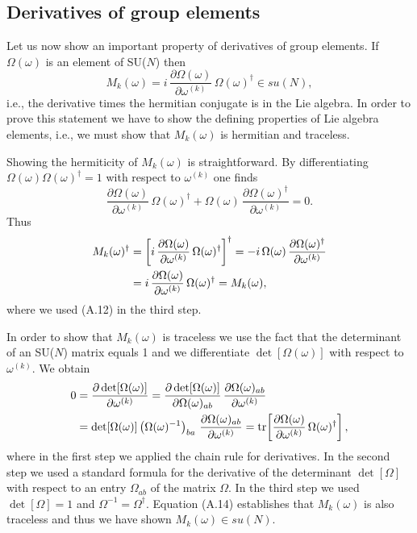 \subsection{Derivatives of group elements}

Let us now show an important property of derivatives of group elements. If
$\Omega(\omega)$ is an element of SU($N$) then
\begin{equation}
  M_k(\omega) = i\,\frac{\partial\Omega(\omega)}{\partial\omega^{(k)}}\,
  \Omega(\omega)^\dagger \in su(N),
\end{equation}
i.e., the derivative times the hermitian conjugate is in the Lie algebra. In
order to prove this statement we have to show the defining properties of Lie
algebra elements, i.e., we must show that $M_k(\omega)$ is hermitian and
traceless.

Showing the hermiticity of $M_k(\omega)$ is straightforward. By differentiating
$\Omega(\omega)\Omega(\omega)^\dagger = 1$ with respect to $\omega^{(k)}$ one
finds
\begin{equation}
  \frac{\partial\Omega(\omega)}{\partial\omega^{(k)}}\,\Omega(\omega)^\dagger
  + \Omega(\omega)\,\frac{\partial\Omega(\omega)^\dagger}{\partial\omega^{(k)}} = 0.
\end{equation}
Thus
\begin{align}
  M_k(\omega)^\dagger &=
  \left[ i\,\frac{\partial\Omega(\omega)}{\partial\omega^{(k)}}\,
  \Omega(\omega)^\dagger \right]^\dagger
  = -i\,\Omega(\omega)\,\frac{\partial\Omega(\omega)^\dagger}{\partial\omega^{(k)}} \notag\\
  &= i\,\frac{\partial\Omega(\omega)}{\partial\omega^{(k)}}\,
  \Omega(\omega)^\dagger = M_k(\omega),
\end{align}
where we used (A.12) in the third step.

In order to show that $M_k(\omega)$ is traceless we use the fact that the
determinant of an SU($N$) matrix equals 1 and we differentiate
$\det[\Omega(\omega)]$ with respect to $\omega^{(k)}$. We obtain
\begin{align}
  0 &= \frac{\partial\det[\Omega(\omega)]}{\partial\omega^{(k)}}
  = \frac{\partial\det[\Omega(\omega)]}{\partial\Omega(\omega)_{ab}}\,
  \frac{\partial\Omega(\omega)_{ab}}{\partial\omega^{(k)}} \notag\\
  &= \det[\Omega(\omega)]\left(\Omega(\omega)^{-1}\right)_{ba}\,
  \frac{\partial\Omega(\omega)_{ab}}{\partial\omega^{(k)}}
  = \operatorname{tr}\!\left[\frac{\partial\Omega(\omega)}{\partial\omega^{(k)}}\,
  \Omega(\omega)^\dagger\right],
\end{align}
where in the first step we applied the chain rule for derivatives. In the second
step we used a standard formula for the derivative of the determinant
$\det[\Omega]$ with respect to an entry $\Omega_{ab}$ of the matrix $\Omega$.
In the third step we used $\det[\Omega] = 1$ and $\Omega^{-1} = \Omega^\dagger$.
Equation (A.14) establishes that $M_k(\omega)$ is also traceless and thus we
have shown $M_k(\omega)\in su(N)$.

